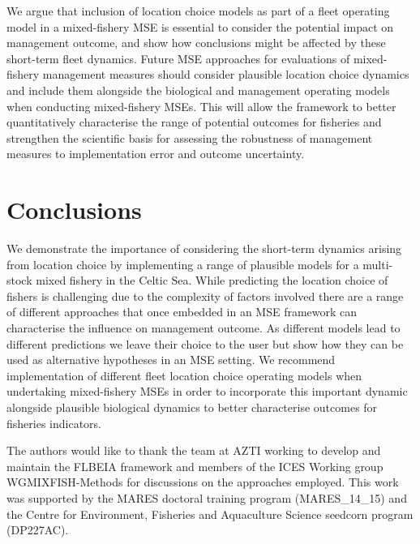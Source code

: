 \documentclass[12pt, halfline, a4paper]{ouparticle}
\begin{document}
We argue that inclusion of location choice models as part of a fleet operating
model in a mixed-fishery MSE is essential to consider the potential impact on
management outcome, and show how conclusions might be affected by these
short-term fleet dynamics. Future MSE approaches for evaluations of
mixed-fishery management measures should consider plausible location choice
dynamics and include them alongside the biological and management operating
models when conducting mixed-fishery MSEs. This will allow the framework to
better quantitatively characterise the range of potential outcomes for
fisheries and strengthen the scientific basis for assessing the robustness of
management measures to implementation error and outcome uncertainty. 

\section{Conclusions} \label{con}

We demonstrate the importance of considering the short-term dynamics arising
from location choice by implementing a range of plausible models for a
multi-stock mixed fishery in the Celtic Sea. While predicting the location
choice of fishers is challenging due to the complexity of factors involved
there are a range of different approaches that once embedded in an MSE
framework can characterise the influence on management outcome. As different
models lead to different predictions we leave their choice to the user but show
how they can be used as alternative hypotheses in an MSE setting. We recommend
implementation of different fleet location choice operating models when
undertaking mixed-fishery MSEs in order to incorporate this important dynamic
alongside plausible biological dynamics to better characterise outcomes for
fisheries indicators.

\begin{notes}[Acknowledgements] The authors would like to thank the team at
	AZTI working to develop and maintain the FLBEIA framework and members
	of the ICES Working group WGMIXFISH-Methods for discussions on the
	approaches employed. This work was supported by the MARES doctoral
	training program (MARES\_14\_15) and the Centre for Environment,
	Fisheries and Aquaculture Science seedcorn program (DP227AC).
\end{notes}




\clearpage
\end{document}

